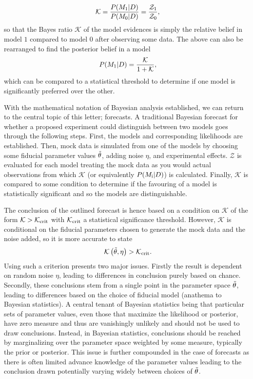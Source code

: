 \documentclass[twocolumn,english,aps,prl,amsmath,amssymb,reprint,footinbib,floatfix,showkeys]{revtex4-2}
\newcommand{\modelz}{M_{\rm 0}}
\newcommand{\modelo}{M_{\rm 1}}
\newcommand{\Z}{\mathcal{Z}}
\newcommand{\br}{\mathcal{K}}
\begin{document}
\begin{equation}~\label{eqn:bayes_ratio}
    \br = \frac{P(\modelo| D)}{P(\modelz | D)} = \frac{\Z_{\rm 1} }{\Z_{\rm 0}},
\end{equation}
so that the Bayes ratio $\br$ of the model evidences is simply the relative belief in model $1$ compared to model $0$ after observing some data. 
The above can also be rearranged to find the posterior belief in a model 
\begin{equation}~\label{eqn:model_posterior_absolute}
    P(\modelo| D) = \frac{\br}{1 + \br},
\end{equation}
which can be compared to a statistical threshold to determine if one model is significantly preferred over the other. 




With the mathematical notation of Bayesian analysis established, we can return to the central topic of this letter; forecasts.
A traditional Bayesian forecast for whether a proposed experiment could distinguish between two models goes through the following steps. 
First, the models and corresponding likelihoods are established.
Then, mock data is simulated from one of the models by choosing some fiducial parameter values $\Tilde{\theta}$, adding noise $\eta$, and experimental effects.
$\Z$ is evaluated for each model treating the mock data as you would actual observations from which $\br$ (or equivalently $P(M_{\rm i}| D)$) is calculated. 
Finally, $\br$ is compared to some condition to determine if the favouring of a model is statistically significant and so the models are distinguishable.


The conclusion of the outlined forecast is hence based on a condition on $\br$ of the form $\br > \br_{\rm crit}$ with $\br_{\rm crit}$ a statistical significance threshold. 
However, $\br$ is conditional on the fiducial parameters chosen to generate the mock data and the noise added, so it is more accurate to state
\begin{equation}~\label{eqn:partially_bayesian_forecast}
    \br\left(\Tilde{\theta}, \eta\right) > \br_{\rm crit}.
\end{equation}
Using such a criterion presents two major issues. 
Firstly the result is dependent on random noise $\eta$, leading to differences in conclusion purely based on chance.
Secondly, these conclusions stem from a single point in the parameter space $\Tilde{\theta}$, leading to differences based on the choice of fiducial model (anathema to Bayesian statistics).
A central tenant of Bayesian statistics being that particular sets of parameter values, even those that maximize the likelihood or posterior, have zero measure and thus are vanishingly unlikely and should not be used to draw conclusions.
Instead, in Bayesian statistics, conclusions should be reached by marginalizing over the parameter space weighted by some measure, typically the prior or posterior. 
This issue is further compounded in the case of forecasts as there is often limited advance knowledge of the parameter values leading to the conclusion drawn potentially varying widely between choices of $\Tilde{\theta}$.
\end{document}
